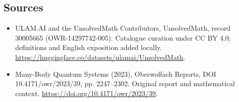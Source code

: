 \documentclass[11pt]{article}
\begin{document}
\subsection{Sources}
\begin{itemize}
\item[\hypertarget{source:30005665:1}{S1}] ULAM.AI and the UnsolvedMath Contributors, UnsolvedMath, record 30005665 (OWR-14297742-005). Catalogue curation under CC BY 4.0; definitions and English exposition added locally.
\url{https://huggingface.co/datasets/ulamai/UnsolvedMath}.
\item[\hypertarget{source:30005665:2}{S2}] Many-Body Quantum Systems (2023), Oberwolfach Reports, DOI 10.4171/owr/2023/39, pp. 2247--2302. Original report and mathematical context.
\url{https://doi.org/10.4171/owr/2023/39}.
\end{itemize}
\label{end:30005665}
\end{document}
